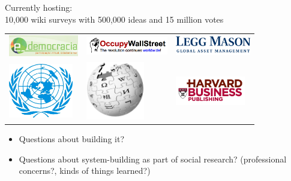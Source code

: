 \documentclass[aspectratio=169]{beamer}
\def\vf{\vfill}
\begin{document}
\begin{frame}

Currently hosting:\\
10,000 wiki surveys with 500,000 ideas and 15 million votes
\vf

\begin{center}
\begin{tabular}{m{1.4in} m{1.4in} m{1.4in}}
\includegraphics[width=1.2in]{figures/edemocracia} & \includegraphics[width=1.4in]{figures/ows_horizontal} & \includegraphics[width=1.3in]{figures/legg_mason_logo}\\
\vspace{0.2in}
\includegraphics[width=1.1in]{figures/un_logo_white_bkg} & \includegraphics[width=1in]{figures/200px-Wikipedia-logo} & \includegraphics[width=1.2in]{figures/harvard_business_publishing}
\end{tabular}
\end{center}

\end{frame}
\begin{frame}

\begin{itemize}
\item Questions about building it?
\item Questions about system-building as part of social research? (professional concerns?, kinds of things learned?)
\end{itemize}

\end{frame}
\end{document}
